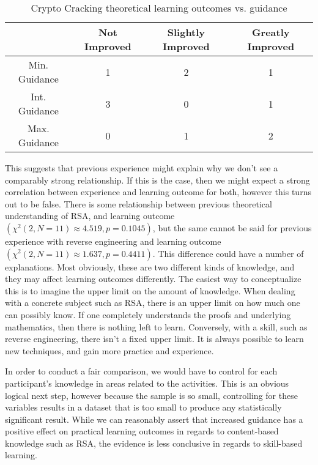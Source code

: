         \begin{table}
        \begin{center}
            \begin{tabular}{|c|c|c|c|}
                \hline
                    & Not Improved & Slightly Improved & Greatly Improved \\
                \hline
                Min. Guidance & 1 & 2 & 1\\
                \hline
                Int. Guidance & 3 & 0 & 1\\
                \hline
                Max. Guidance & 0 & 1 & 2\\
                \hline
            \end{tabular}

            \caption{Crypto Cracking theoretical learning outcomes vs. guidance}\label{tab:cc-tLO-v-g}
        \end{center}
        \end{table}

        This suggests that previous experience might explain why we don't see a comparably strong relationship. 
        If this is the case, then we might expect a strong correlation between experience and learning outcome for both, however this turns out to be false. 
        There is some relationship between previous theoretical understanding of RSA, and learning outcome $(\chi^2(2, N=11)\approx4.519,  p = 0.1045)$, but the same cannot be said for previous experience with reverse engineering and learning outcome $(\chi^2(2, N=11)\approx1.637,  p = 0.4411)$. 
        This difference could have a number of explanations. 
        Most obviously, these are two different kinds of knowledge, and they may affect learning outcomes differently. 
        The easiest way to conceptualize this is to imagine the upper limit on the amount of knowledge. 
        When dealing with a concrete subject such as RSA, there is an upper limit on how much one can possibly know. 
        If one completely understands the proofs and underlying mathematics, then there is nothing left to learn. Conversely, with a skill, such as reverse engineering, there isn't a fixed upper limit. 
        It is always possible to learn new techniques, and gain more practice and experience. 

        In order to conduct a fair comparison, we would have to control for each participant's knowledge in areas related to the activities. 
        This is an obvious logical next step, however because the sample is so small, controlling for these variables results in a dataset that is too small to produce any statistically significant result. 
        While we can reasonably assert that increased guidance has a positive effect on practical learning outcomes in regards to content-based knowledge such as RSA, the evidence is less conclusive in regards to skill-based learning. 

